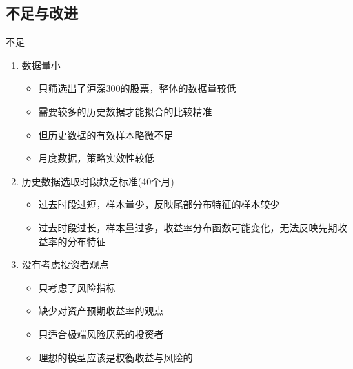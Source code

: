 \documentclass[CJK,aspectratio=43]{beamer}  %
\begin{document}
\subsection{不足与改进}
\begin{frame}{不足}
	\begin{enumerate}
		\item 数据量小
		\begin{itemize}
			\item 只筛选出了沪深300的股票，整体的数据量较低
			\item 需要较多的历史数据才能拟合的比较精准
			\item 但历史数据的有效样本略微不足
			\item 月度数据，策略实效性较低
		\end{itemize}
			\item  历史数据选取时段缺乏标准(40个月)
		\begin{itemize}
			\item 过去时段过短，样本量少，反映尾部分布特征的样本较少
			\item 过去时段过长，样本量过多，收益率分布函数可能变化，无法反映先期收益率的分布特征
		\end{itemize}
		\item  没有考虑投资者观点
		\begin{itemize}
			\item 只考虑了风险指标
			\item 缺少对资产预期收益率的观点
			\item 只适合极端风险厌恶的投资者
			\item 理想的模型应该是权衡收益与风险的
		\end{itemize}
	\end{enumerate}
\end{frame}
\end{document}
